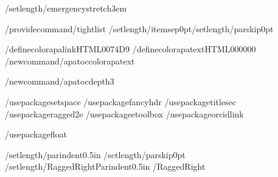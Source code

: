 /setlength{/emergencystretch}{3em} %

/providecommand{/tightlist}{%
  /setlength{/itemsep}{0pt}/setlength{/parskip}{0pt}}






%

/definecolor{apalink}{HTML}{0074D9}
/definecolor{apatext}{HTML}{000000}
/newcommand{/apatoccolor}{apatext}

/newcommand{/apatocdepth}{3}

/usepackage{setspace}
/usepackage{fancyhdr}
/usepackage{titlesec}
/usepackage{ragged2e}
/usepackage{etoolbox}
/usepackage{orcidlink}

/usepackage{float}

/setlength{/parindent}{0.5in}
/setlength{/parskip}{0pt}
/setlength{/RaggedRightParindent}{0.5in}
/RaggedRight

